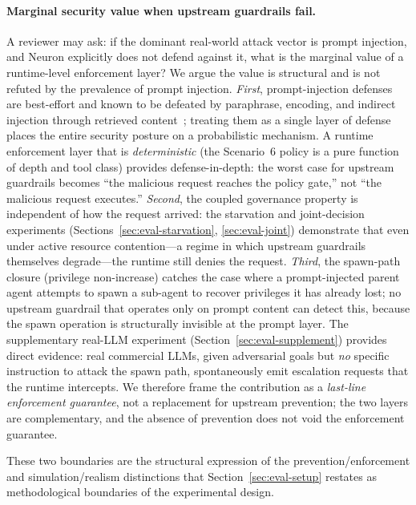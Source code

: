 \paragraph{Marginal security value when upstream guardrails fail.}
A reviewer may ask: if the dominant real-world attack vector is prompt
injection, and Neuron explicitly does not defend against it, what is the
marginal value of a runtime-level enforcement layer? We argue the value
is structural and is not refuted by the prevalence of prompt injection.
\emph{First}, prompt-injection defenses are best-effort and known to be
defeated by paraphrase, encoding, and indirect injection through
retrieved content~\cite{debenedetti2024agentdojo}; treating them as a
single layer of defense places the entire security posture on a
probabilistic mechanism. A runtime enforcement layer that is
\emph{deterministic} (the Scenario~6 policy is a pure function of depth
and tool class) provides defense-in-depth: the worst case for upstream
guardrails becomes ``the malicious request reaches the policy gate,''
not ``the malicious request executes.'' \emph{Second}, the coupled
governance property is independent of how the request arrived: the
starvation and joint-decision experiments
(Sections~\ref{sec:eval-starvation}, \ref{sec:eval-joint}) demonstrate
that even under active resource contention---a regime in which upstream
guardrails themselves degrade---the runtime still denies the request.
\emph{Third}, the spawn-path closure (privilege non-increase) catches
the case where a prompt-injected parent agent attempts to spawn a
sub-agent to recover privileges it has already lost; no upstream
guardrail that operates only on prompt content can detect this, because
the spawn operation is structurally invisible at the prompt layer. The
supplementary real-LLM experiment (Section~\ref{sec:eval-supplement})
provides direct evidence: real commercial LLMs, given adversarial goals
but \emph{no} specific instruction to attack the spawn path,
spontaneously emit escalation requests that the runtime intercepts. We
therefore frame the contribution as a \emph{last-line enforcement
guarantee}, not a replacement for upstream prevention; the two layers
are complementary, and the absence of prevention does not void the
enforcement guarantee.

These two boundaries are the structural expression of the
prevention/enforcement and simulation/realism distinctions that
Section~\ref{sec:eval-setup} restates as methodological boundaries of
the experimental design.
